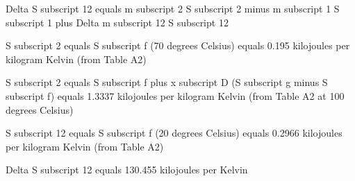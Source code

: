 Delta S subscript 12 equals m subscript 2 S subscript 2 minus m subscript 1 S subscript 1 plus Delta m subscript 12 S subscript 12  

S subscript 2 equals S subscript f (70 degrees Celsius) equals 0.195 kilojoules per kilogram Kelvin (from Table A2)  

S subscript 2 equals S subscript f plus x subscript D (S subscript g minus S subscript f)  
equals 1.3337 kilojoules per kilogram Kelvin (from Table A2 at 100 degrees Celsius)  

S subscript 12 equals S subscript f (20 degrees Celsius) equals 0.2966 kilojoules per kilogram Kelvin (from Table A2)  

Delta S subscript 12 equals 130.455 kilojoules per Kelvin